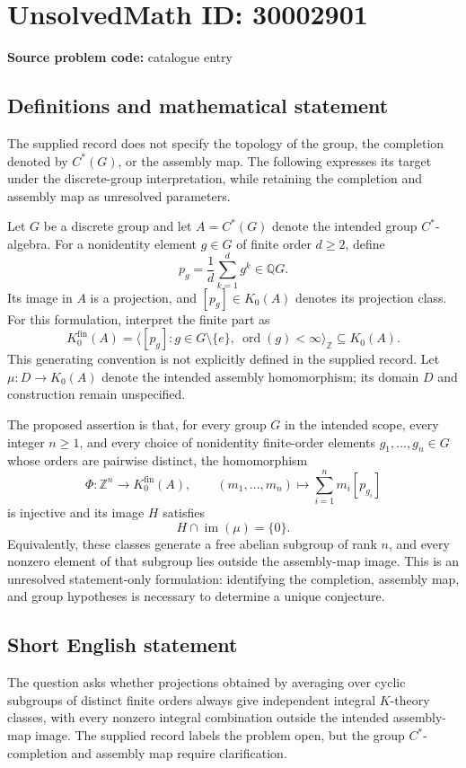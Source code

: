 \documentclass[11pt]{article}
\newcommand{\Z}{\mathbb{Z}}
\newcommand{\Q}{\mathbb{Q}}
\begin{document}
\section*{UnsolvedMath ID: 30002901}
\textbf{Source problem code:} catalogue entry
\subsection{Definitions and mathematical statement}
The supplied record does not specify the topology of the group, the completion denoted by \(C^*(G)\), or the assembly map. The following expresses its target under the discrete-group interpretation, while retaining the completion and assembly map as unresolved parameters.

Let \(G\) be a discrete group and let \(A=C^*(G)\) denote the intended group \(C^*\)-algebra. For a nonidentity element \(g\in G\) of finite order \(d\geq 2\), define
\[
p_g=\frac{1}{d}\sum_{k=1}^{d}g^k\in\Q G.
\]
Its image in \(A\) is a projection, and \([p_g]\in K_0(A)\) denotes its projection class. For this formulation, interpret the finite part as
\[
K_0^{\mathrm{fin}}(A)=\big\langle [p_g]:g\in G\setminus\{e\},\ \operatorname{ord}(g)<\infty\big\rangle_{\Z}\subseteq K_0(A).
\]
This generating convention is not explicitly defined in the supplied record. Let \(\mu:D\longrightarrow K_0(A)\) denote the intended assembly homomorphism; its domain \(D\) and construction remain unspecified.

The proposed assertion is that, for every group \(G\) in the intended scope, every integer \(n\geq 1\), and every choice of nonidentity finite-order elements \(g_1,\ldots,g_n\in G\) whose orders are pairwise distinct, the homomorphism
\[
\Phi:\Z^n\longrightarrow K_0^{\mathrm{fin}}(A),\qquad
(m_1,\ldots,m_n)\longmapsto\sum_{i=1}^{n}m_i[p_{g_i}]
\]
is injective and its image \(H\) satisfies
\[
H\cap\operatorname{im}(\mu)=\{0\}.
\]
Equivalently, these classes generate a free abelian subgroup of rank \(n\), and every nonzero element of that subgroup lies outside the assembly-map image. This is an unresolved statement-only formulation: identifying the completion, assembly map, and group hypotheses is necessary to determine a unique conjecture.
\subsection{Short English statement}
The question asks whether projections obtained by averaging over cyclic subgroups of distinct finite orders always give independent integral \(K\)-theory classes, with every nonzero integral combination outside the intended assembly-map image. The supplied record labels the problem open, but the group \(C^*\)-completion and assembly map require clarification.
\end{document}
